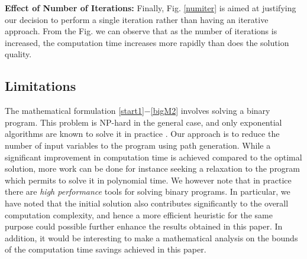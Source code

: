 \documentclass[journal]{IEEEtran}
\begin{document}
\noindent \textbf{Effect of Number of Iterations:} Finally, Fig. \ref{numiter} is aimed at justifying our decision to perform a single iteration rather than having an iterative approach. From the Fig. we can observe that as the number of iterations is increased, the computation time increases more rapidly than does the solution quality.

\subsection{Limitations}
The mathematical formulation \eqref{start1}$-$\eqref{bigM2} involves solving a binary program. This problem is NP-hard in the general case, and only exponential algorithms are known to solve it in practice \cite{Woeginger03}. Our approach is to reduce the number of input variables to the program using path generation. While a significant improvement in computation time is achieved compared to the optimal solution, more work can be done for instance seeking a relaxation to the program which permits to solve it in polynomial time. We however note that in practice there are \emph{high performance} tools \cite{CPLEX12.4} for solving binary programs. In particular, we have noted that the initial solution also contributes significantly to the overall computation complexity, and hence a more efficient heuristic for the same purpose could possible further enhance the results obtained in this paper. In addition, it would be interesting to make a mathematical analysis on the bounds of the computation time savings achieved in this paper.
\end{document}
